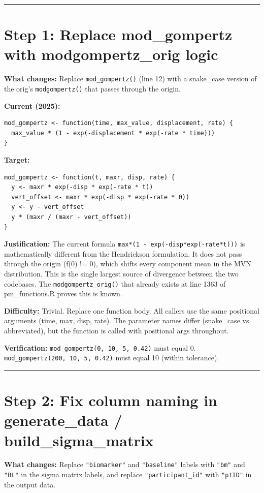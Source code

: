 \documentclass[11pt]{article}
\begin{document}
\bigskip\noindent\rule{\textwidth}{0.4pt}\bigskip

\section{Step 1: Replace mod\_gompertz with modgompertz\_orig logic}

\textbf{What changes:} Replace \texttt{mod\_gompertz()} (line 12) with a
snake\_case version of the orig's \texttt{modgompertz()} that passes
through the origin.

\textbf{Current (2025):}
\begin{lstlisting}
mod_gompertz <- function(time, max_value, displacement, rate) {
  max_value * (1 - exp(-displacement * exp(-rate * time)))
}
\end{lstlisting}

\textbf{Target:}
\begin{lstlisting}
mod_gompertz <- function(t, maxr, disp, rate) {
  y <- maxr * exp(-disp * exp(-rate * t))
  vert_offset <- maxr * exp(-disp * exp(-rate * 0))
  y <- y - vert_offset
  y * (maxr / (maxr - vert_offset))
}
\end{lstlisting}

\textbf{Justification:} The current formula \texttt{max*(1 - exp(-disp*exp(-rate*t)))}
is mathematically different from the Hendrickson formulation. It does
not pass through the origin (f(0) != 0), which shifts every component
mean in the MVN distribution. This is the single largest source of
divergence between the two codebases. The \texttt{modgompertz\_orig()} that
already exists at line 1363 of pm\_functions.R proves this is known.

\textbf{Difficulty:} Trivial. Replace one function body. All callers use
the same positional arguments (time, max, disp, rate). The parameter
names differ (snake\_case vs abbreviated), but the function is called
with positional args throughout.

\textbf{Verification:} \texttt{mod\_gompertz(0, 10, 5, 0.42)} must equal 0.
\texttt{mod\_gompertz(200, 10, 5, 0.42)} must equal 10 (within tolerance).

\bigskip\noindent\rule{\textwidth}{0.4pt}\bigskip

\section{Step 2: Fix column naming in generate\_data / build\_sigma\_matrix}

\textbf{What changes:} Replace \texttt{"biomarker"} and \texttt{"baseline"} labels
with \texttt{"bm"} and \texttt{"BL"} in the sigma matrix labels, and replace
\texttt{"participant\_id"} with \texttt{"ptID"} in the output data.
\end{document}
